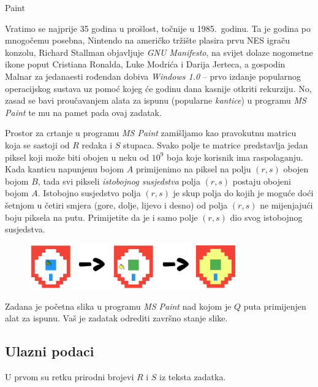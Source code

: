 \begin{statement}[
  problempoints=100,
  timelimit=1 sekunda,
  memorylimit=512 MiB,
]{Paint}

Vratimo se najprije 35 godina u prošlost, točnije u 1985.\ godinu. Ta je godina
po mnogočemu posebna, Nintendo na američko tržište plasira prvu NES igraču
konzolu, Richard Stallman objavljuje \textit{GNU Manifesto}, na svijet dolaze
nogometne ikone poput Cristiana Ronalda, Luke Modrića i Darija Jerteca, a
gospodin Malnar za jedanaesti rođendan dobiva \textit{Windows 1.0} -- prvo
izdanje popularnog operacijskog sustava uz pomoć kojeg će godinu dana kasnije
otkriti rekurziju. No, zasad se bavi proučavanjem alata za ispunu (popularne
\textit{kantice}) u programu \textit{MS Paint} te mu na pamet pada ovaj zadatak.

Prostor za crtanje u programu \textit{MS Paint} zamišljamo kao pravokutnu
matricu koja se sastoji od $R$ redaka i $S$ stupaca. Svako polje te matrice
predstavlja jedan piksel koji može biti obojen u neku od $10^9$ boja koje
korisnik ima raspolaganju. Kada kanticu napunjenu bojom $A$ primijenimo na
piksel na polju $(r, s)$ obojen bojom $B$, tada svi pikseli
\textit{istobojnog susjedstva} polja $(r, s)$ postaju obojeni bojom $A$.
Istobojno susjedstvo polja $(r, s)$ je skup polja do kojih je moguće doći
šetnjom u četiri smjera (gore, dolje, lijevo i desno) od polja $(r, s)$ ne
mijenjajući boju piksela na putu. Primijetite da je i samo polje $(r, s)$ dio
svog istobojnog susjedstva.

\begin{figure}[H]
\centering
\includegraphics[width=0.8\textwidth]{img/paint_skica.png}
\end{figure}


Zadana je početna slika u programu \textit{MS Paint} nad kojom je $Q$ puta
primijenjen alat za ispunu. Vaš je zadatak odrediti završno stanje slike.

\subsection*{Ulazni podaci}
U prvom su retku prirodni brojevi $R$ i $S$ iz teksta zadatka.


\end{statement}
